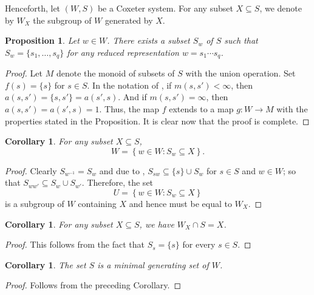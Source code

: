 \documentclass{article}
\theoremstyle{thmstyle}
\newtheorem{proposition}[theorem]{Proposition}
\theoremstyle{defstyle}
\newtheorem{corollary}[theorem]{Corollary}
\begin{document}
Henceforth, let $(W, S)$ be a Coxeter system. For any subset $X\subseteq S$, we denote by $W_X$ the subgroup of $W$ generated by $X$.

\begin{proposition}
    Let $w\in W$. There exists a subset $S_w$ of $S$ such that $S_w = \{s_1,\dots,s_q\}$ for \emph{any} reduced representation $w = s_1\cdots s_q$.
\end{proposition}
\begin{proof}
    Let $M$ denote the monoid of subsets of $S$ with the union operation. Set $f(s) = \{s\}$ for $s\in S$. In the notation of , if $m(s, s') < \infty$, then $a(s, s') = \{s, s'\} = a(s', s)$. And if $m(s, s') = \infty$, then $a(s, s') = a(s', s) = 1$. Thus, the map $f$ extends to a map $g: W\to M$ with the properties stated in the Proposition. It is clear now that the proof is complete.
\end{proof}

\begin{corollary}
    For any subset $X\subseteq S$, 
    \begin{equation*}
        W = \left\{w\in W\colon S_w\subseteq X\right\}.
    \end{equation*}
\end{corollary}
\begin{proof}
    Clearly $S_{w^{-1}} = S_w$ and due to , $S_{sw}\subseteq \{s\}\cup S_{w}$ for $s\in S$ and $w\in W$; so that $S_{ww'}\subseteq S_w\cup S_{w'}$. Therefore, the set 
    \begin{equation*}
        U = \left\{w\in W\colon S_w\subseteq X\right\}
    \end{equation*}
    is a subgroup of $W$ containing $X$ and hence must be equal to $W_X$.
\end{proof}

\begin{corollary}
    For any subset $X\subseteq S$, we have $W_X\cap S = X$.
\end{corollary}
\begin{proof}
    This follows from the fact that $S_s = \{s\}$ for every $s\in S$.
\end{proof}

\begin{corollary}
    The set $S$ is a minimal generating set of $W$.
\end{corollary}
\begin{proof}
    Follows from the preceding Corollary.
\end{proof}
\end{document}
